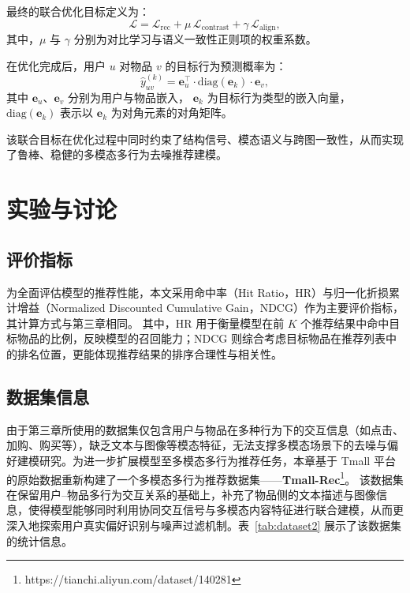 最终的联合优化目标定义为：
\begin{equation}
\mathcal{L} =
\mathcal{L}_{\mathrm{rec}}
+
\mu \, \mathcal{L}_{\mathrm{contrast}}
+
\gamma \, \mathcal{L}_{\mathrm{align}},
\end{equation}
其中，$\mu$ 与 $\gamma$ 分别为对比学习与语义一致性正则项的权重系数。

在优化完成后，用户 $u$ 对物品 $v$ 的目标行为预测概率为：
\begin{equation}
\hat{y}_{uv}^{(k)} =
\mathbf{e}_u^\top
\cdot
\mathrm{diag}(\mathbf{e}_k)
\cdot
\mathbf{e}_v,
\end{equation}
其中 $\mathbf{e}_u$、$\mathbf{e}_v$ 分别为用户与物品嵌入，
$\mathbf{e}_k$ 为目标行为类型的嵌入向量，
$\mathrm{diag}(\mathbf{e}_k)$ 表示以 $\mathbf{e}_k$ 为对角元素的对角矩阵。

该联合目标在优化过程中同时约束了结构信号、模态语义与跨图一致性，从而实现了鲁棒、稳健的多模态多行为去噪推荐建模。

\section{实验与讨论}

\subsection{评价指标}
为全面评估模型的推荐性能，本文采用命中率（Hit Ratio，HR）与归一化折损累计增益（Normalized Discounted Cumulative Gain，NDCG）作为主要评价指标，其计算方式与第三章相同。
其中，HR 用于衡量模型在前 $K$ 个推荐结果中命中目标物品的比例，反映模型的召回能力；NDCG 则综合考虑目标物品在推荐列表中的排名位置，更能体现推荐结果的排序合理性与相关性。

\subsection{数据集信息}
由于第三章所使用的数据集仅包含用户与物品在多种行为下的交互信息（如点击、加购、购买等），缺乏文本与图像等模态特征，无法支撑多模态场景下的去噪与偏好建模研究。为进一步扩展模型至多模态多行为推荐任务，本章基于 Tmall 平台的原始数据重新构建了一个多模态多行为推荐数据集——\textbf{Tmall-Rec}\footnote{https://tianchi.aliyun.com/dataset/140281}。  
该数据集在保留用户–物品多行为交互关系的基础上，补充了物品侧的文本描述与图像信息，使得模型能够同时利用协同交互信号与多模态内容特征进行联合建模，从而更深入地探索用户真实偏好识别与噪声过滤机制。表~\ref{tab:dataset2} 展示了该数据集的统计信息。

\begin{table}[h]
\centering
\caption{Tmall-Rec 数据集的统计信息}
\renewcommand{\arraystretch}{1.0}
\label{tab:dataset2}
\end{table}

